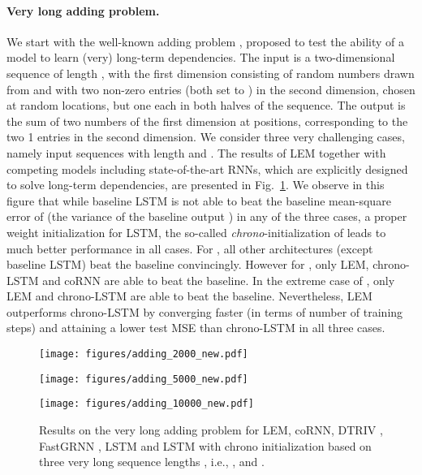 \documentclass{article} \usepackage{iclr2022_conference,times}
\newcommand{\fref}[1] {Fig.~\ref{#1}}
\begin{document}
\paragraph{Very long adding problem.}
We start with the well-known adding problem \citep{lstm}, proposed to test the ability of a model to learn (very) long-term dependencies. The input is a two-dimensional sequence of length , with the first dimension consisting of random numbers drawn from  and with two non-zero entries (both set to ) in the second dimension, chosen at random locations, but one each in both halves of the sequence. The output is the sum of two numbers of the first dimension at positions, corresponding to the two 1 entries in the second dimension. We consider three very challenging cases, namely input sequences with length  and . The results of LEM together with competing models including state-of-the-art RNNs, which are explicitly designed to solve long-term dependencies, are presented in \fref{fig:adding_results}. We observe in this figure that while baseline LSTM is not able to beat the baseline mean-square error of  (the variance of the baseline output ) in any of the three cases, a proper weight initialization for LSTM, the so-called \emph{chrono}-initialization of \cite{warp} leads to much better performance in all cases. For , all other architectures (except baseline LSTM) beat the baseline convincingly. However for , only LEM, chrono-LSTM and coRNN are able to beat the baseline. In the extreme case of , only LEM and chrono-LSTM are able to beat the baseline. Nevertheless, LEM outperforms chrono-LSTM by converging faster (in terms of number of training steps) and attaining a lower test MSE than chrono-LSTM in all three cases. 
\begin{figure}[ht!]
\begin{minipage}{.33\textwidth}
\texttt{[image: figures/adding\_2000\_new.pdf]}
\end{minipage}\begin{minipage}{.33\textwidth}
\texttt{[image: figures/adding\_5000\_new.pdf]}
\end{minipage}\begin{minipage}{.33\textwidth}
\texttt{[image: figures/adding\_10000\_new.pdf]}
\end{minipage}
\caption{Results on the very long adding problem for LEM, coRNN, DTRIV \citep{dtriv}, FastGRNN \citep{fastrnn}, LSTM and LSTM with chrono initialization \citep{warp} based on three very long sequence lengths , i.e., ,  and .}
\label{fig:adding_results}
\end{figure}
\end{document}
